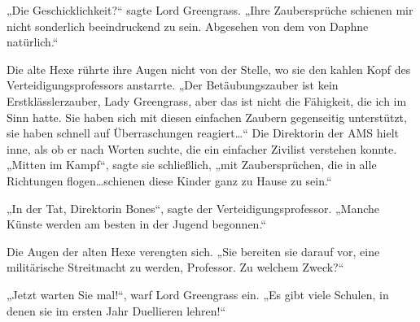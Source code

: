 „Die Geschicklichkeit?“ sagte Lord Greengrass. „Ihre Zaubersprüche schienen mir nicht sonderlich beeindruckend zu sein. Abgesehen von dem von Daphne natürlich.“

Die alte Hexe rührte ihre Augen nicht von der Stelle, wo sie den kahlen Kopf des Verteidigungsprofessors anstarrte. „Der Betäubungszauber ist kein Erstklässlerzauber, Lady Greengrass, aber das ist nicht die Fähigkeit, die ich im Sinn hatte. Sie haben sich mit diesen einfachen Zaubern gegenseitig unterstützt, sie haben schnell auf Überraschungen reagiert…“ Die Direktorin der AMS hielt inne, als ob er nach Worten suchte, die ein einfacher Zivilist verstehen konnte. „Mitten im Kampf“, sagte sie schließlich, „mit Zaubersprüchen, die in alle Richtungen flogen…schienen diese Kinder ganz zu Hause zu sein.“

„In der Tat, Direktorin Bones“, sagte der Verteidigungsprofessor. „Manche Künste werden am besten in der Jugend begonnen.“

Die Augen der alten Hexe verengten sich. „Sie bereiten sie darauf vor, eine militärische Streitmacht zu werden, Professor. Zu welchem Zweck?“

„Jetzt warten Sie mal!“, warf Lord Greengrass ein. „Es gibt viele Schulen, in denen sie im ersten Jahr Duellieren lehren!“

